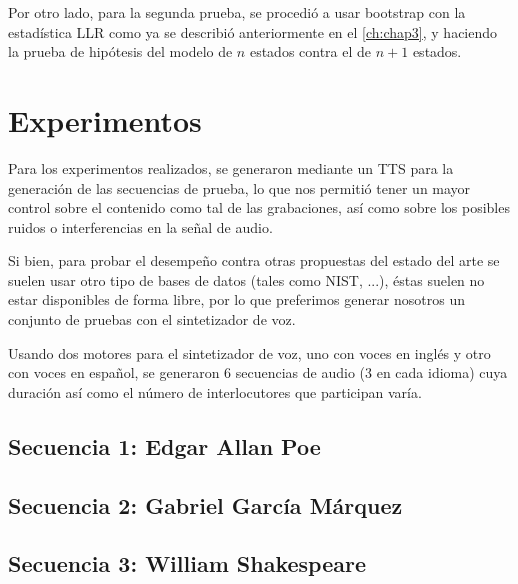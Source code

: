 Por otro lado, para la segunda prueba, se procedió a usar bootstrap con la estadística \ac{LLR} como ya se describió anteriormente en el \autoref{ch:chap3}, y haciendo la prueba de hipótesis del modelo de $n$ estados contra el de $n+1$ estados.

\section{Experimentos} %
\label{sec:experimentos}

Para los experimentos realizados, se generaron mediante un \ac{TTS} para la generación de las secuencias de prueba, lo que nos permitió tener un mayor control sobre el contenido como tal de las grabaciones, así como sobre los posibles ruidos o interferencias en la señal de audio.

Si bien, para probar el desempeño contra otras propuestas del estado del arte se suelen usar otro tipo de bases de datos (tales como \ac{NIST}, ...), éstas suelen no estar disponibles de forma libre, por lo que preferimos generar nosotros un conjunto de pruebas con el sintetizador de voz.

Usando dos motores para el sintetizador de voz, uno con voces en inglés y otro con voces en español, se generaron 6 secuencias de audio (3 en cada idioma) cuya duración así como el número de interlocutores que participan varía.

\subsection[Secuencia 1]{Secuencia 1: Edgar Allan Poe} %
\label{ssub:allanpoe}

   


\subsection[Secuencia 2]{Secuencia 2: Gabriel García Márquez} %
\label{ssub:soledad}

   


\subsection[Secuencia 3]{Secuencia 3: William Shakespeare}
\label{ssub:lear}


